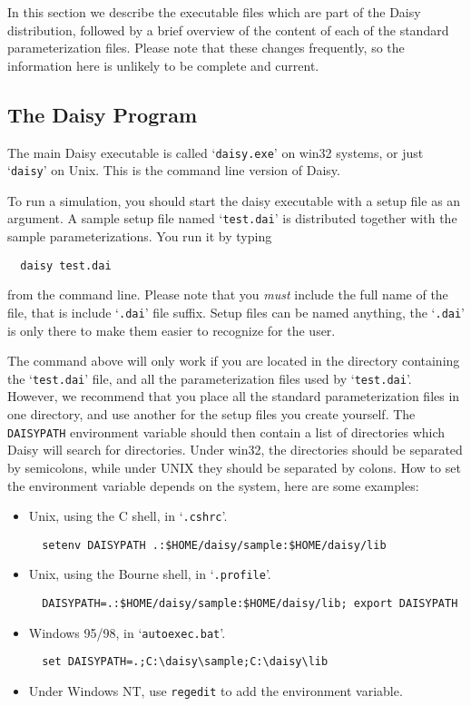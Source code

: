 In this section we describe the executable files which are part of the
Daisy distribution, followed by a brief overview of the content of
each of the standard parameterization files.  Please note that these
changes frequently, so the information here is unlikely to be
complete and current.

\subsection{The Daisy Program}

The main Daisy executable is called `\texttt{daisy.exe}' on win32
systems, or just `\texttt{daisy}' on Unix.  This is the command line
version of Daisy.  

To run a simulation, you should start the daisy executable with a
setup file as an argument.  A sample setup file named
`\texttt{test.dai}' is distributed together with the sample
parameterizations.  You run it by typing
\begin{verbatim}
  daisy test.dai
\end{verbatim}
from the command line.  Please note that you \emph{must} include the
full name of the file, that is include `\texttt{.dai}' file suffix.
Setup files can be named anything, the `\texttt{.dai}' is only there
to make them easier to recognize for the user.

The command above will only work if you are located in the directory
containing the `\texttt{test.dai}' file, and all the parameterization
files used by `\texttt{test.dai}'.  However, we recommend that you
place all the standard parameterization files in one directory, and
use another for the setup files you create yourself.  The
\texttt{DAISYPATH} environment variable should then contain a list of
directories which Daisy will search for directories.  Under win32, the
directories should be separated by semicolons, while under UNIX they
should be separated by colons.  How to set the environment variable
depends on the system, here are some examples:
\begin{itemize}
\item Unix, using the C shell, in `\texttt{.cshrc}'.
\begin{verbatim}
  setenv DAISYPATH .:$HOME/daisy/sample:$HOME/daisy/lib
\end{verbatim}
\item Unix, using the Bourne shell, in `\texttt{.profile}'.
\begin{verbatim}
  DAISYPATH=.:$HOME/daisy/sample:$HOME/daisy/lib; export DAISYPATH
\end{verbatim}
\item Windows 95/98, in `\texttt{autoexec.bat}'.
\begin{verbatim}
  set DAISYPATH=.;C:\daisy\sample;C:\daisy\lib
\end{verbatim}
\item Under Windows NT, use \texttt{regedit} to add the environment
  variable. 
\end{itemize}

